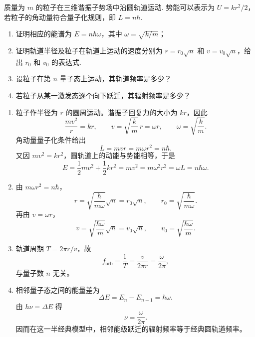 \begin{exercise}\label{ex:24.2}
质量为 $m$ 的粒子在三维谐振子势场中沿圆轨道运动. 势能可以表示为 $U = kr^2/2$，若粒子的角动量符合量子化规则，即 $L = n\hbar$. 
\begin{enumerate}
  \item[(a)] 证明相应的能谱为 $E = n\hbar\omega$，其中 $\omega = \sqrt{k/m}$；
  \item[(b)] 证明轨道半径及粒子在轨道上运动的速度分别为 $r = r_0\sqrt{n}$ 和 $v = v_0\sqrt{n}$，给出 $r_0$ 和 $v_0$ 的表达式. 
  \item[(c)] 设粒子在第 $n$ 量子态上运动，其轨道频率是多少？
  \item[(d)] 若粒子从某一激发态逐个向下跃迁，其辐射频率是多少？
\end{enumerate}
\end{exercise}
\begin{solution}
\begin{enumerate}
    \item[(a)] 粒子作半径为 $r$ 的圆周运动。谐振子回复力的大小为 $kr$，因此
    \[
      \frac{mv^2}{r}=kr,
      \qquad
      v=\sqrt{\frac{k}{m}}\,r=\omega r,
      \qquad
      \omega=\sqrt{\frac{k}{m}}.
    \]
    角动量量子化条件给出
    \[
      L=mvr=m\omega r^2=n\hbar.
    \]
    又因 $mv^2=kr^2$，圆轨道上的动能与势能相等，于是
    \[
      E=\frac12mv^2+\frac12kr^2
       =mv^2
       =m\omega^2r^2
       =\omega L
       =n\hbar\omega.
    \]

    \item[(b)] 由 $m\omega r^2=n\hbar$，
    \[
      r=\sqrt{\frac{\hbar}{m\omega}}\sqrt n
       =r_0\sqrt n,
      \qquad
      r_0=\sqrt{\frac{\hbar}{m\omega}}.
    \]
    再由 $v=\omega r$，
    \[
      v=\sqrt{\frac{\hbar\omega}{m}}\sqrt n
       =v_0\sqrt n,
      \qquad
      v_0=\sqrt{\frac{\hbar\omega}{m}}.
    \]

    \item[(c)] 轨道周期 $T=2\pi r/v$，故
    \[
      f_{\mathrm{orb}}=\frac{1}{T}
      =\frac{v}{2\pi r}
      =\frac{\omega}{2\pi},
    \]
    与量子数 $n$ 无关。

    \item[(d)] 相邻量子态之间的能量差为
    \[
      \Delta E=E_n-E_{n-1}=\hbar\omega.
    \]
    由 $h\nu=\Delta E$ 得
    \[
      \nu=\frac{\omega}{2\pi}.
    \]
    因而在这一半经典模型中，相邻能级跃迁的辐射频率等于经典圆轨道频率。
\end{enumerate}
\end{solution}

